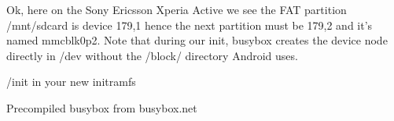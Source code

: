 
Ok, here on the Sony Ericsson Xperia Active we see the FAT partition /mnt/sdcard
is device 179,1 hence the next partition must be 179,2 and it's named mmcblk0p2.
Note that during our init, busybox creates the device node directly in /dev
without the /block/ directory Android uses.

/init in your new initramfs

% 
% 
% 
% 
% 
% 
% 

Precompiled busybox from busybox.net

